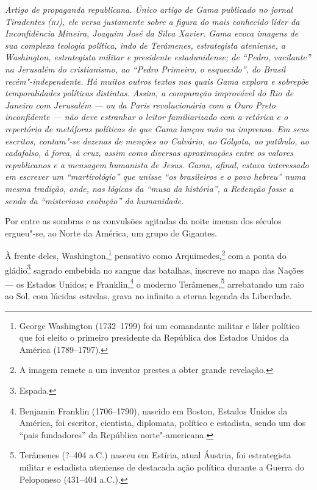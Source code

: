 \begin{flushleft}
{\footnotesize\itshape
Artigo de propaganda republicana. Único artigo de Gama publicado
no jornal Tiradentes (\textsc{rj}), ele versa justamente sobre a figura do mais
conhecido líder da Inconfidência Mineira, Joaquim José da Silva Xavier.
Gama evoca imagens de sua complexa teologia política,
indo de Terâmenes, estrategista ateniense, a
Washington, estrategista militar e presidente estadunidense; de ``Pedro,
vacilante'' na Jerusalém do cristianismo, ao ``Pedro Primeiro, o
esquecido'', do Brasil recém"-independente. Há muitos outros textos nos
quais Gama explora e sobrepõe temporalidades políticas
distintas. Assim, a comparação improvável do Rio de Janeiro com
Jerusalém --- ou da Paris revolucionária com a Ouro
Preto inconfidente --- não deve estranhar o leitor familiarizado com a
retórica e o repertório de metáforas políticas de que Gama lançou mão
na imprensa. Em seus escritos, contam"-se dezenas de
menções ao Calvário, ao Gólgota, ao patíbulo, ao cadafalso, à forca, à
cruz, assim como diversas aproximações entre os valores republicanos e a
mensagem humanista de Jesus. Gama, afinal, estava interessado em
escrever um ``martirológio'' que unisse ``os brasileiros e o povo hebreu''
numa mesma tradição, onde, nas lógicas da ``musa da história'', a Redenção
fosse a senda da ``misteriosa evolução'' da humanidade. }
\end{flushleft}

\noindent{}Por entre as sombras e as convulsões agitadas da noite imensa dos
séculos ergueu"-se, ao Norte da América, um grupo de Gigantes.

À frente deles, Washington,\footnote{George Washington (1732--1799) foi
  um comandante militar e líder político que foi eleito o primeiro
  presidente da República dos Estados Unidos da América (1789--1797).}
pensativo como Arquimedes,\footnote{A
  imagem remete a um inventor prestes a obter grande revelação.}
com a ponta do gládio\footnote{Espada.} sagrado embebida no sangue das
batalhas, inscreve no mapa das Nações --- os Estados Unidos; e
Franklin,\footnote{Benjamin Franklin (1706--1790), nascido em Boston,
  Estados Unidos da América, foi escritor, cientista, diplomata,
  político e estadista, sendo um dos ``pais fundadores'' da República
  norte"-americana.} o moderno Terâmenes,\footnote{Terâmenes (?--404
  a.C.) nasceu em Estíria, atual Áustria, foi estrategista militar e
  estadista ateniense de destacada ação política durante a Guerra do
  Peloponeso (431--404 a.C.).} arrebatando um raio ao Sol, com
lúcidas estrelas, grava no infinito a eterna legenda da Liberdade.

